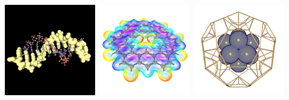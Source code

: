 \documentclass[a4paper,12pt]{article}
\begin{document}
\begin{center}
\includegraphics[scale=0.58]{figures/gallery/g8_sm.png}\
\includegraphics[scale=0.58]{figures/gallery/g18_sm.png}\
\includegraphics[scale=0.58]{figures/gallery/g19_sm.png}\
\end{center}



\newpage




\end{document}
